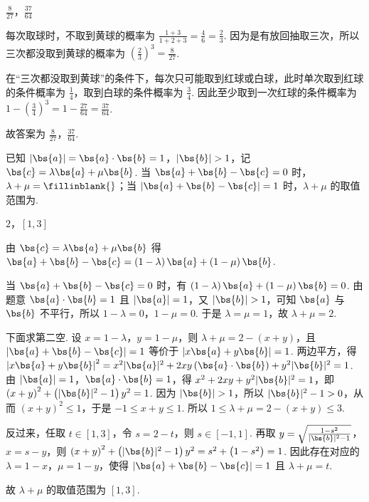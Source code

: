 \documentclass[UTF8,a4paper,oneside,11pt]{ctexbook}
\begin{document}
\begin{answer}
\(\frac{8}{27}\)，\(\frac{37}{64}\)
\end{answer}

\begin{solution}
每次取球时，不取到黄球的概率为 \(\frac{1+3}{1+2+3}=\frac{4}{6}=\frac{2}{3}\). 因为是有放回抽取三次，所以三次都没取到黄球的概率为 \(\left( \frac{2}{3} \right)^3=\frac{8}{27}\).

在“三次都没取到黄球”的条件下，每次只可能取到红球或白球，此时单次取到红球的条件概率为 \(\frac{1}{4}\)，取到白球的条件概率为 \(\frac{3}{4}\). 因此至少取到一次红球的条件概率为 \(1-\left( \frac{3}{4} \right)^3=1-\frac{27}{64}=\frac{37}{64}\).

故答案为 \(\frac{8}{27}\)，\(\frac{37}{64}\).
\end{solution}

\begin{problem}
已知 \(|\bs{a}|=\bs{a}\cdot \bs{b}=1\)，\(|\bs{b}|>1\)，记 \(\bs{c}=\lambda \bs{a}+\mu \bs{b}\). 当 \(\bs{a}+\bs{b}-\bs{c}=0\) 时，\(\lambda+\mu=\fillinblank{}\)；当 \(|\bs{a}+\bs{b}-\bs{c}|=1\) 时，\(\lambda+\mu\) 的取值范围为\fillinblank{}.
\end{problem}

\begin{answer}
\(2\)，\([1,3]\)
\end{answer}

\begin{solution}
由 \(\bs{c}=\lambda \bs{a}+\mu \bs{b}\) 得 \(\bs{a}+\bs{b}-\bs{c}=\left( 1-\lambda \right)\bs{a}+\left( 1-\mu \right)\bs{b}\).

当 \(\bs{a}+\bs{b}-\bs{c}=0\) 时，有 \(\left( 1-\lambda \right)\bs{a}+\left( 1-\mu \right)\bs{b}=0\). 由题意 \(\bs{a}\cdot \bs{b}=1\) 且 \(|\bs{a}|=1\)，又 \(|\bs{b}|>1\)，可知 \(\bs{a}\) 与 \(\bs{b}\) 不平行，所以 \(1-\lambda=0\)，\(1-\mu=0\). 于是 \(\lambda=\mu=1\)，故 \(\lambda+\mu=2\).

下面求第二空. 设 \(x=1-\lambda\)，\(y=1-\mu\)，则 \(\lambda+\mu=2-\left( x+y \right)\)，且 \(\left| \bs{a}+\bs{b}-\bs{c} \right|=1\) 等价于 \(\left| x\bs{a}+y\bs{b} \right|=1\). 两边平方，得 \(\left| x\bs{a}+y\bs{b} \right|^2=x^2|\bs{a}|^2+2xy\left( \bs{a}\cdot \bs{b} \right)+y^2|\bs{b}|^2=1\). 由 \(|\bs{a}|=1\)，\(\bs{a}\cdot \bs{b}=1\)，得 \(x^2+2xy+y^2|\bs{b}|^2=1\)，即 \(\left( x+y \right)^2+\left( |\bs{b}|^2-1 \right)y^2=1\). 因为 \(|\bs{b}|>1\)，所以 \(|\bs{b}|^2-1>0\)，从而 \(\left( x+y \right)^2\le 1\)，于是 \(-1\le x+y\le 1\). 所以 \(1\le \lambda+\mu=2-\left( x+y \right)\le 3\).

反过来，任取 \(t\in [1,3]\)，令 \(s=2-t\)，则 \(s\in [-1,1]\). 再取 \(y=\sqrt{\frac{1-s^2}{|\bs{b}|^2-1}}\)，\(x=s-y\)，则 \(\left( x+y \right)^2+\left( |\bs{b}|^2-1 \right)y^2=s^2+\left( 1-s^2 \right)=1\). 因此存在对应的 \(\lambda=1-x\)，\(\mu=1-y\)，使得 \(|\bs{a}+\bs{b}-\bs{c}|=1\) 且 \(\lambda+\mu=t\).

故 \(\lambda+\mu\) 的取值范围为 \([1,3]\).
\end{solution}
\end{document}
